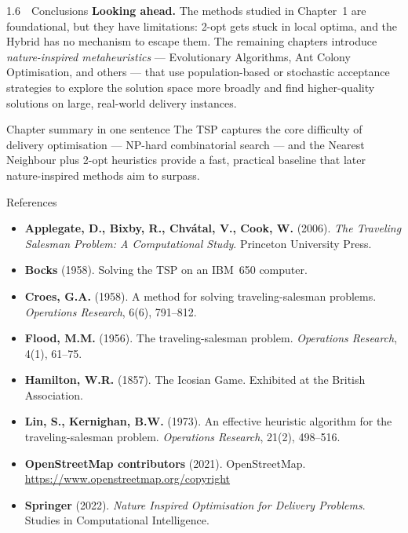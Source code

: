 \documentclass[aspectratio=169,10pt]{beamer}
\begin{document}
\begin{frame}[allowframebreaks]{1.6~~Conclusions}
  \medskip
  \textbf{Looking ahead.}
  The methods studied in Chapter~1 are foundational, but they have
  limitations: 2-opt gets stuck in local optima, and the Hybrid has no
  mechanism to escape them.  The remaining chapters introduce
  \emph{nature-inspired metaheuristics} --- Evolutionary Algorithms,
  Ant Colony Optimisation, and others --- that use population-based or
  stochastic acceptance strategies to explore the solution space more
  broadly and find higher-quality solutions on large, real-world
  delivery instances.

  \begin{block}{Chapter summary in one sentence}
    The TSP captures the core difficulty of delivery optimisation ---
    NP-hard combinatorial search --- and the Nearest Neighbour plus 2-opt
    heuristics provide a fast, practical baseline that later
    nature-inspired methods aim to surpass.
  \end{block}

\end{frame}

\begin{frame}[allowframebreaks]{References}

  \begin{itemize}
    \item \textbf{Applegate, D., Bixby, R., Chv\'atal, V., Cook, W.}
      (2006).  \emph{The Traveling Salesman Problem: A Computational
      Study}.  Princeton University Press.

    \item \textbf{Bocks} (1958).  Solving the TSP on an IBM~650 computer.

    \item \textbf{Croes, G.A.} (1958).  A method for solving
      traveling-salesman problems.  \emph{Operations Research}, 6(6),
      791--812.

    \item \textbf{Flood, M.M.} (1956).  The traveling-salesman problem.
      \emph{Operations Research}, 4(1), 61--75.

    \item \textbf{Hamilton, W.R.} (1857).  The Icosian Game.  Exhibited
      at the British Association.

    \item \textbf{Lin, S., Kernighan, B.W.} (1973).  An effective
      heuristic algorithm for the traveling-salesman problem.
      \emph{Operations Research}, 21(2), 498--516.

    \item \textbf{OpenStreetMap contributors} (2021).  OpenStreetMap.
      \url{https://www.openstreetmap.org/copyright}

    \item \textbf{Springer} (2022).  \emph{Nature Inspired Optimisation
      for Delivery Problems}.  Studies in Computational Intelligence.
  \end{itemize}

\end{frame}
\end{document}

